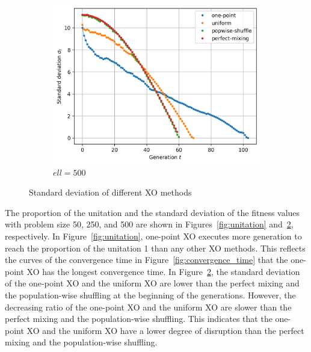 \documentclass{article}
\begin{document}
\begin{enumerate}[label=(\alph*)]
\begin{figure}[h]
\begin{subfigure}[b]{0.32\linewidth}
            \end{subfigure}
            \hfill
            \begin{subfigure}[b]{0.32\linewidth}
                  \centering
                  \includegraphics[width=\linewidth]{fig-std_500.png}
                  \caption{$ell=500$}
                  \label{fig:std-500}
            \end{subfigure}
            \caption{Standard deviation of different XO methods}
            \label{fig:std}
      \end{figure}
      
      The proportion of the unitation and the standard deviation of the fitness values with problem size 50, 250, and 500 are 
      shown in Figures~\ref{fig:unitation} and~\ref{fig:std}, respectively.
      In Figure~\ref{fig:unitation}, one-point XO executes more generation to reach the proportion of the unitation 1 than any other XO methods.
      This reflects the curves of the convergence time in Figure~\ref{fig:convergence_time} that the one-point XO has the longest convergence time.
      In Figure~\ref{fig:std}, the standard deviation of the one-point XO and the uniform XO are lower than the perfect mixing and the population-wise shuffling
      at the beginning of the generations. However, the decreasing ratio of the one-point XO and the uniform XO are slower than the perfect mixing and the population-wise shuffling.
      This indicates that the one-point XO and the uniform XO have a lower degree of disruption than the perfect mixing and the population-wise shuffling.
      

\end{enumerate}
\end{document}
